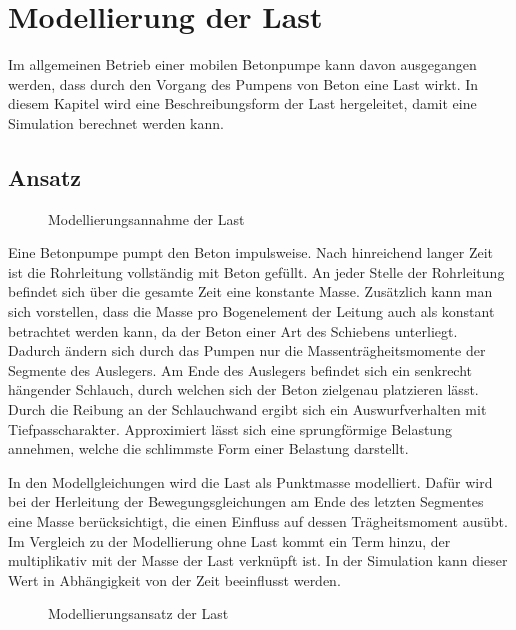 \chapter{Modellierung der Last}
\label{abs:Lastmodellierung}

Im allgemeinen Betrieb einer mobilen Betonpumpe kann davon ausgegangen werden, dass durch den Vorgang des Pumpens von Beton eine Last wirkt. In diesem Kapitel wird eine Beschreibungsform der Last hergeleitet, damit eine Simulation berechnet werden kann.

\section{Ansatz}

\begin{figure}[h]
	\centering
	
	\caption{Modellierungsannahme der Last}
	\label{fig:Manipulator_Last}
\end{figure}

Eine Betonpumpe pumpt den Beton impulsweise. Nach hinreichend langer Zeit ist die Rohrleitung vollständig mit Beton gefüllt. An jeder Stelle der Rohrleitung befindet sich über die gesamte Zeit eine konstante Masse. Zusätzlich kann man sich vorstellen, dass die Masse pro Bogenelement der Leitung auch als konstant betrachtet werden kann, da der Beton einer Art des Schiebens unterliegt. Dadurch ändern sich durch das Pumpen nur die Massenträgheitsmomente der Segmente des Auslegers. Am Ende des Auslegers befindet sich ein senkrecht hängender Schlauch, durch welchen sich der Beton zielgenau platzieren lässt. Durch die Reibung an der Schlauchwand ergibt sich ein Auswurfverhalten mit Tiefpasscharakter. Approximiert lässt sich eine sprungförmige Belastung annehmen, welche die schlimmste Form einer Belastung darstellt. 

In den Modellgleichungen wird die Last als Punktmasse modelliert. Dafür wird bei der Herleitung der Bewegungsgleichungen am Ende des letzten Segmentes eine Masse berücksichtigt, die einen Einfluss auf dessen Trägheitsmoment ausübt. Im Vergleich zu der Modellierung ohne Last kommt ein Term hinzu, der multiplikativ mit der Masse der Last verknüpft ist. In der Simulation kann dieser Wert in Abhängigkeit von der Zeit beeinflusst werden.  

\begin{figure}[h]
	\centering
	
	\caption{Modellierungsansatz der Last}
	\label{fig:Manipulator_Last}
\end{figure} 
